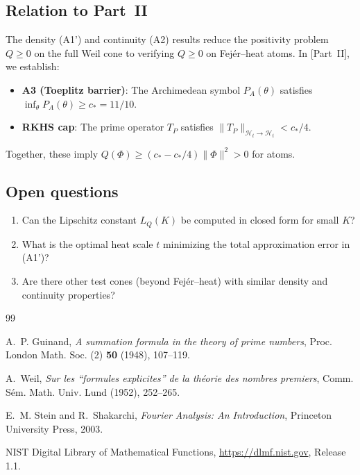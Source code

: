 \documentclass[11pt,a4paper]{article}
\theoremstyle{definition}
\theoremstyle{remark}
\begin{document}
\subsection{Relation to Part~II}

The density (A1') and continuity (A2) results reduce the positivity problem $Q \geq 0$ on the full Weil cone to verifying $Q \geq 0$ on Fej\'er--heat atoms. In [Part~II], we establish:
\begin{itemize}
  \item \textbf{A3 (Toeplitz barrier)}: The Archimedean symbol $P_A(\theta)$ satisfies $\inf_\theta P_A(\theta) \geq c_* = 11/10$.
  \item \textbf{RKHS cap}: The prime operator $T_P$ satisfies $\|T_P\|_{\mathcal{H}_t \to \mathcal{H}_t} < c_*/4$.
\end{itemize}
Together, these imply $Q(\Phi) \geq (c_* - c_*/4)\|\Phi\|^2 > 0$ for atoms.

\subsection{Open questions}

\begin{enumerate}
  \item Can the Lipschitz constant $L_Q(K)$ be computed in closed form for small $K$?
  \item What is the optimal heat scale $t$ minimizing the total approximation error in (A1')?
  \item Are there other test cones (beyond Fej\'er--heat) with similar density and continuity properties?
\end{enumerate}


\begin{thebibliography}{99}

A.~P. Guinand,
\textit{A summation formula in the theory of prime numbers},
Proc. London Math. Soc. (2) \textbf{50} (1948), 107--119.

A.~Weil,
\textit{Sur les ``formules explicites'' de la th\'eorie des nombres premiers},
Comm. S\'em. Math. Univ. Lund (1952), 252--265.

E.~M. Stein and R.~Shakarchi,
\textit{Fourier Analysis: An Introduction},
Princeton University Press, 2003.

NIST Digital Library of Mathematical Functions,
\url{https://dlmf.nist.gov}, Release 1.1.

\end{thebibliography}
\end{document}
